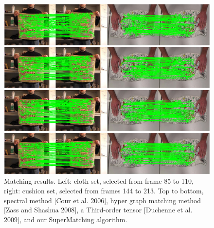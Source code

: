 \begin{figure}
\centering
  \includegraphics[width=1.00\linewidth]{figures/2DDeformable.jpg}
  \caption{Matching results. Left: cloth set, selected from frame 85 to 110, right: cushion set, selected from frames 144 to 213.
  Top to bottom, spectral method [Cour et al. 2006], hyper graph matching method [Zass and Shashua 2008], a Third-order tensor [Duchenne et al. 2009], and our SuperMatching algorithm.}
\label{fig:2DDeformable}
\end{figure}

